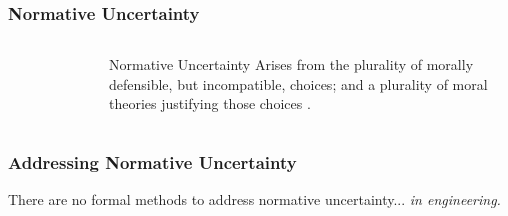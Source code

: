 \begin{frame}
    \frametitle{Normative Uncertainty}


    \begin{columns}
        \column[t]{4cm}
        \begin{figure}
            \centering
        \end{figure}

        \column[t]{6cm}
        \begin{block}{Normative Uncertainty}
            Arises from the plurality of morally defensible, but incompatible, choices;
            and a plurality of moral theories justifying those choices 
            \cite{taebi_governing_2020,van_uffelen_revisiting_2024}.
        \end{block}
        
    \end{columns}

\end{frame}





\begin{frame}
    \frametitle{Addressing Normative Uncertainty}

    There are no formal methods to address normative uncertainty... \textit{in engineering.}

\end{frame}
